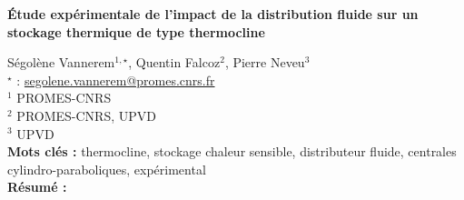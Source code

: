 


    \newpage

\BgThispage

%
\begin{flushleft}
\addtocounter{section}{1}
{\Large \textbf{Étude expérimentale de l'impact de la distribution fluide sur un stockage thermique de type thermocline}}\label{ref:84}
\end{flushleft}
%
Ségolène Vannerem$^{1,\star}$, Quentin Falcoz$^{2}$, Pierre Neveu$^{3}$\\[2mm]
$^{\star}$ \Letter : \url{segolene.vannerem@promes.cnrs.fr}\\[2mm]
{\footnotesize $^{1}$ PROMES-CNRS}\\
{\footnotesize $^{2}$ PROMES-CNRS, UPVD}\\
{\footnotesize $^{3}$ UPVD}\\
[4mm]
%
\noindent \textbf{Mots clés : } thermocline, stockage chaleur sensible, distributeur fluide, centrales cylindro-paraboliques, expérimental\\[4mm]
%
\noindent \textbf{Résumé : } 

